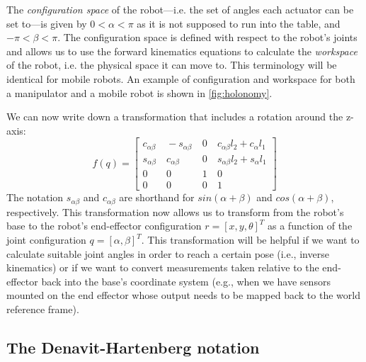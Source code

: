 The \textsl{configuration space} of the robot---i.e. the set of angles each actuator can be set to---is given by $ 0 < \alpha < \pi $ as it is not supposed to run into the table, and $ -\pi < \beta < \pi$.
The configuration space is defined with respect to the robot's joints and allows us to use the forward kinematics equations to calculate the \textsl{workspace} of the robot, i.e. the physical space it can move to.
This terminology will be identical for mobile robots. An example of configuration and workspace for both a manipulator and a mobile robot is shown in \cref{fig:holonomy}.

We can now write down  a transformation that includes a rotation around the z-axis:
\begin{equation}
\label{eq:2armtrans}
f(q) = \left[\begin{array}{cccc}c_{\alpha\beta} & \ -s_{\alpha\beta} & \  0 & \ c_{\alpha\beta}l_2+c_\alpha l_1\\
                        s_{\alpha\beta} & \ c_{\alpha\beta} & \ 0 & \ s_{\alpha\beta}l_2+s_\alpha l_1\\
                                                0 & \ 0 & \ 1 & \ 0\\
                                                0 & \ 0 & \ 0 & \ 1\end{array}\right]
\end{equation}
The notation $s_{\alpha\beta}$ and $c_{\alpha\beta}$ are shorthand for $sin(\alpha+\beta)$ and $cos(\alpha+\beta)$, respectively.
%
This transformation now allows us to transform from the robot's base to the robot's end-effector configuration $r = [x, y, \theta]^T$ as a function of the joint configuration $q = [\alpha, \beta]^T$.
This transformation will be helpful if we want to calculate suitable joint angles in order to reach a certain pose (i.e., inverse kinematics) or if we want to convert measurements taken relative to the end-effector back into the base's coordinate system (e.g., when we have sensors mounted on the end effector whose output needs to be mapped back to the world reference frame).


\subsection{The Denavit-Hartenberg notation}\label{sec:kinematics:fwk:dh}


